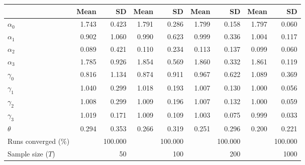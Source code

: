 
\begin{tabular}[t]{lrrrrrrrr}
\toprule
  & Mean & SD & Mean  & SD  & Mean   & SD   & Mean    & SD   \\
\midrule
$\alpha_{0}$ & 1.743 & 0.423 & 1.791 & 0.286 & 1.799 & 0.158 & 1.797 & 0.060\\
$\alpha_{1}$ & 0.902 & 1.060 & 0.990 & 0.623 & 0.999 & 0.336 & 1.004 & 0.117\\
$\alpha_{2}$ & 0.089 & 0.421 & 0.110 & 0.234 & 0.113 & 0.137 & 0.099 & 0.060\\
$\alpha_{3}$ & 1.785 & 0.926 & 1.854 & 0.569 & 1.860 & 0.332 & 1.861 & 0.119\\
$\gamma_{0}$ & 0.816 & 1.134 & 0.874 & 0.911 & 0.967 & 0.622 & 1.089 & 0.369\\
$\gamma_{1}$ & 1.040 & 0.299 & 1.018 & 0.193 & 1.007 & 0.130 & 1.000 & 0.056\\
$\gamma_{2}$ & 1.008 & 0.299 & 1.009 & 0.196 & 1.007 & 0.132 & 1.000 & 0.059\\
$\gamma_{3}$ & 1.019 & 0.171 & 1.009 & 0.109 & 1.003 & 0.075 & 0.999 & 0.033\\
$\theta$ & 0.294 & 0.353 & 0.266 & 0.319 & 0.251 & 0.296 & 0.200 & 0.221\\
Runs converged (\%) &  & 100.000 &  & 100.000 &  & 100.000 &  & 100.000\\
Sample size ($T$) &  & 50 &  & 100 &  & 200 &  & 1000\\
\bottomrule
\end{tabular}

